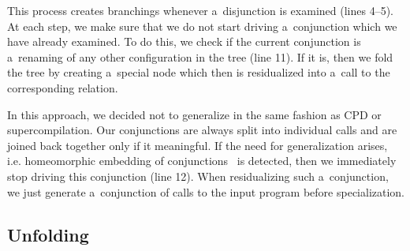 This process creates branchings whenever a~disjunction is examined (lines 4--5).
At each step, we make sure that we do not start driving a~conjunction which we have already examined.
To do this, we check if the current conjunction is a~renaming of any other configuration in the tree (line 11).
If it is, then we fold the tree by creating a~special node which then is residualized into a~call to the corresponding relation.

In this approach, we decided not to generalize in the same fashion as CPD or supercompilation.
Our conjunctions are always split into individual calls and are joined back together only if it meaningful.
If the need for generalization arises, i.e. homeomorphic embedding of conjunctions~\cite{de1999conjunctive} is detected, then we immediately stop driving this conjunction (line 12).
When residualizing such a~conjunction, we just generate a~conjunction of calls to the input program before specialization.




\subsection{Unfolding}

